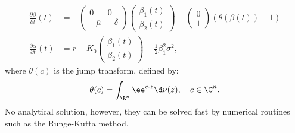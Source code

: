 



\begin{align*}
  \frac{\partial \beta}{\partial t} (t) &= - \begin{pmatrix}
0 & 0\\
-\overline{\mu} & -\delta
\end{pmatrix}
\begin{pmatrix}
\beta_1(t)\\
\beta_2(t)
\end{pmatrix}
- \begin{pmatrix}
0\\
1
\end{pmatrix}
(\theta(\beta(t)) - 1) \\
\frac{\partial \alpha}{\partial t} (t) &= r- K_0 \begin{pmatrix}
\beta_1(t)\\
\beta_2(t)
\end{pmatrix}
 - \frac{1}{2} \beta_1^2 \sigma^2  
,\end{align*}
where  $\theta(c)$ is the jump transform, defined by:
\[ 
  \theta(c) = \int_{\R^{n}} \ee^{c \cdot z} \d \nu(z),\quad  c \in \C^{n}
.\]
No analytical solution, however, they can be solved fast by numerical routines such as the
Runge-Kutta method.



